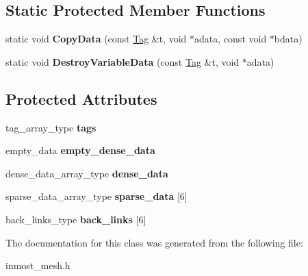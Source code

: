 \subsection*{Static Protected Member Functions}
\begin{DoxyCompactItemize}
\item 
\hypertarget{classINMOST_1_1TagManager_a3646206503d7c8bc5a7d1ab2f2550798}{static void {\bfseries Copy\-Data} (const \hyperlink{classINMOST_1_1Tag}{Tag} \&t, void $\ast$adata, const void $\ast$bdata)}\label{classINMOST_1_1TagManager_a3646206503d7c8bc5a7d1ab2f2550798}

\item 
\hypertarget{classINMOST_1_1TagManager_aa41305bccd3e4be8bfd5ff0b8246c807}{static void {\bfseries Destroy\-Variable\-Data} (const \hyperlink{classINMOST_1_1Tag}{Tag} \&t, void $\ast$adata)}\label{classINMOST_1_1TagManager_aa41305bccd3e4be8bfd5ff0b8246c807}

\end{DoxyCompactItemize}
\subsection*{Protected Attributes}
\begin{DoxyCompactItemize}
\item 
\hypertarget{classINMOST_1_1TagManager_ac92171533d42711a11684c52f6dfa737}{tag\-\_\-array\-\_\-type {\bfseries tags}}\label{classINMOST_1_1TagManager_ac92171533d42711a11684c52f6dfa737}

\item 
\hypertarget{classINMOST_1_1TagManager_ac6f6cb319ebef941d38a8e2c8f17db94}{empty\-\_\-data {\bfseries empty\-\_\-dense\-\_\-data}}\label{classINMOST_1_1TagManager_ac6f6cb319ebef941d38a8e2c8f17db94}

\item 
\hypertarget{classINMOST_1_1TagManager_abaf73c1edda087f369ef969b64e6d9a1}{dense\-\_\-data\-\_\-array\-\_\-type {\bfseries dense\-\_\-data}}\label{classINMOST_1_1TagManager_abaf73c1edda087f369ef969b64e6d9a1}

\item 
\hypertarget{classINMOST_1_1TagManager_ad4fada89bccb1b59070868d0509cf70e}{sparse\-\_\-data\-\_\-array\-\_\-type {\bfseries sparse\-\_\-data} \mbox{[}6\mbox{]}}\label{classINMOST_1_1TagManager_ad4fada89bccb1b59070868d0509cf70e}

\item 
\hypertarget{classINMOST_1_1TagManager_aa9676936366e5777fa061e22ea6672ca}{back\-\_\-links\-\_\-type {\bfseries back\-\_\-links} \mbox{[}6\mbox{]}}\label{classINMOST_1_1TagManager_aa9676936366e5777fa061e22ea6672ca}

\end{DoxyCompactItemize}


The documentation for this class was generated from the following file\-:\begin{DoxyCompactItemize}
\item 
inmost\-\_\-mesh.\-h\end{DoxyCompactItemize}

